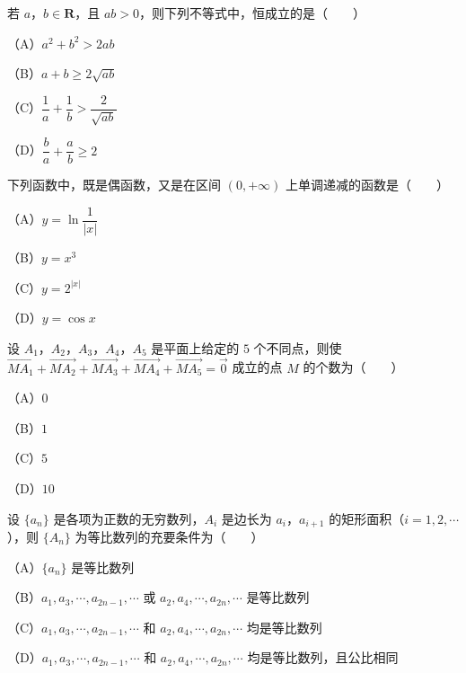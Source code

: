 \begin{question}
若 $a$，$b\in\mathbf R$，且 $ab>0$，则下列不等式中，恒成立的是\mbox{（　　）}

（A）$a^2+b^2>2ab$

（B）$a+b\geqslant2\sqrt{ab}$

（C）$\dfrac1a+\dfrac1b>\dfrac2{\sqrt{ab}}$

（D）$\dfrac ba+\dfrac ab\geqslant2$

\end{question}
\begin{question}
下列函数中，既是偶函数，又是在区间 $(0,+\infty)$ 上单调递减的函数是\mbox{（　　）}

（A）$y=\ln\dfrac1{|x|}$

（B）$y=x^3$

（C）$y=2^{|x|}$

（D）$y=\cos x$

\end{question}
\begin{question}
设 $A_1$，$A_2$，$A_3$，$A_4$，$A_5$ 是平面上给定的 $5$ 个不同点，则使 $\overrightarrow{MA_1}+\overrightarrow{MA_2}+\overrightarrow{MA_3}+\overrightarrow{MA_4}+\overrightarrow{MA_5}=\vec 0$ 成立的点 $M$ 的个数为\mbox{（　　）}

（A）$0$

（B）$1$

（C）$5$

（D）$10$

\end{question}
\begin{question}
设 $\{a_n\}$ 是各项为正数的无穷数列，$A_i$ 是边长为 $a_i$，$a_{i+1}$ 的矩形面积（$i=1,2,\cdots$），则 $\{A_n\}$ 为等比数列的充要条件为\mbox{（　　）}

（A）$\{a_n\}$ 是等比数列

（B）$a_1,a_3,\cdots,a_{2n-1},\cdots$ 或 $a_2,a_4,\cdots,a_{2n},\cdots$ 是等比数列

（C）$a_1,a_3,\cdots,a_{2n-1},\cdots$ 和 $a_2,a_4,\cdots,a_{2n},\cdots$ 均是等比数列

（D）$a_1,a_3,\cdots,a_{2n-1},\cdots$ 和 $a_2,a_4,\cdots,a_{2n},\cdots$ 均是等比数列，且公比相同

\end{question}

